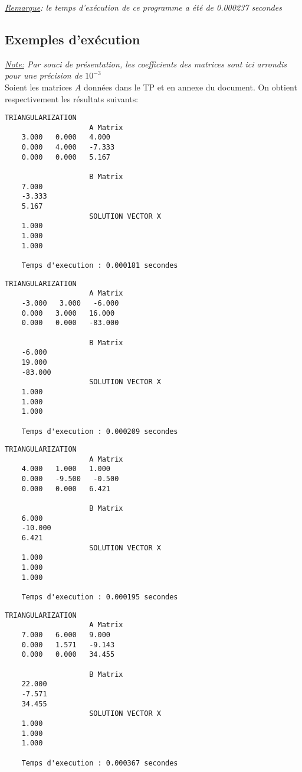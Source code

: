 \textit{\underline{Remarque}: le temps d'exécution de ce programme a été de 0.000237 secondes}
\subsection{Exemples d'exécution}

\textit{\underline{Note:} Par souci de présentation, les coefficients des matrices sont ici arrondis pour une précision de $10^{-3}$}\vspace{4pt}\\
Soient les matrices $A$ données dans le TP et en annexe du document. On obtient respectivement les résultats suivants:\\

\begin{lstlisting}[caption={$A_1X=B$} results, basicstyle=\fontsize{8}{10}\selectfont]
					TRIANGULARIZATION 
					A Matrix 
	3.000   0.000   4.000   
	0.000   4.000   -7.333   
	0.000   0.000   5.167   
	
					B Matrix 
	7.000   
	-3.333   
	5.167   
					SOLUTION VECTOR X 
	1.000   
	1.000   
	1.000   
	
	Temps d'execution : 0.000181 secondes
\end{lstlisting}
\begin{lstlisting}[caption={$A_2X=B$} results, basicstyle=\fontsize{8}{10}\selectfont]
					TRIANGULARIZATION 
					A Matrix 
	-3.000   3.000   -6.000   
	0.000   3.000   16.000   
	0.000   0.000   -83.000   
	
					B Matrix 
	-6.000   
	19.000   
	-83.000   
					SOLUTION VECTOR X 
	1.000   
	1.000   
	1.000   
	
	Temps d'execution : 0.000209 secondes
\end{lstlisting}
\begin{lstlisting}[caption={$A_3X=B$} results, basicstyle=\fontsize{8}{10}\selectfont]
					TRIANGULARIZATION 
					A Matrix 
	4.000   1.000   1.000   
	0.000   -9.500   -0.500   
	0.000   0.000   6.421   
	
					B Matrix 
	6.000   
	-10.000   
	6.421   
					SOLUTION VECTOR X 
	1.000   
	1.000   
	1.000   
	
	Temps d'execution : 0.000195 secondes
\end{lstlisting}
\begin{lstlisting}[caption={$A_4X=B$} results, basicstyle=\fontsize{8}{10}\selectfont]
					TRIANGULARIZATION 
					A Matrix 
	7.000   6.000   9.000   
	0.000   1.571   -9.143   
	0.000   0.000   34.455   
	
					B Matrix 
	22.000   
	-7.571   
	34.455   
					SOLUTION VECTOR X 
	1.000   
	1.000   
	1.000   
	
	Temps d'execution : 0.000367 secondes
\end{lstlisting}
